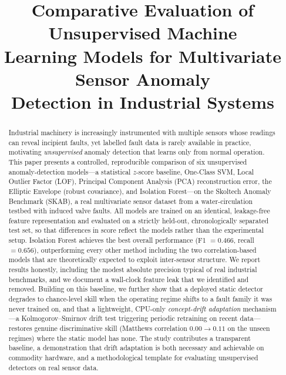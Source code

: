 \documentclass[conference]{IEEEtran}
\begin{document}
\title{Comparative Evaluation of Unsupervised Machine\\ Learning Models for Multivariate Sensor Anomaly\\ Detection in Industrial Systems}

\author{
\and
{}
}

\maketitle

\begin{abstract}
Industrial machinery is increasingly instrumented with multiple sensors whose
readings can reveal incipient faults, yet labelled fault data is rarely
available in practice, motivating \emph{unsupervised} anomaly detection that
learns only from normal operation. This paper presents a controlled,
reproducible comparison of six unsupervised anomaly-detection models---a
statistical $z$-score baseline, One-Class SVM, Local Outlier Factor (LOF),
Principal Component Analysis (PCA) reconstruction error, the Elliptic Envelope
(robust covariance), and Isolation Forest---on the Skoltech Anomaly Benchmark
(SKAB), a real multivariate sensor dataset from a water-circulation testbed
with induced valve faults. All models are trained on an identical, leakage-free
feature representation and evaluated on a strictly held-out, chronologically
separated test set, so that differences in score reflect the models rather than
the experimental setup. Isolation Forest achieves the best overall performance
(F1 $=0.466$, recall $=0.656$), outperforming every other method including the
two correlation-based models that are theoretically expected to exploit
inter-sensor structure. We report results honestly, including the modest
absolute precision typical of real industrial benchmarks, and we document a
wall-clock feature leak that we identified and removed. Building on this
baseline, we further show that a deployed static detector degrades to
chance-level skill when the operating regime shifts to a fault family it was
never trained on, and that a lightweight, CPU-only \emph{concept-drift
adaptation} mechanism---a Kolmogorov--Smirnov drift test triggering periodic
retraining on recent data---restores genuine discriminative skill (Matthews
correlation $0.00 \rightarrow 0.11$ on the unseen regimes) where the static
model has none. The study contributes a transparent baseline, a demonstration
that drift adaptation is both necessary and achievable on commodity hardware,
and a methodological template for evaluating unsupervised detectors on real
sensor data.
\end{abstract}
\end{document}
